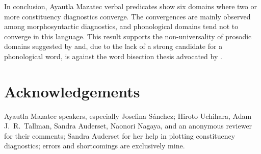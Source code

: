 \documentclass[output=paper]{langscibook}
\begin{document}
In conclusion, Ayautla Mazatec verbal predicates show six domains where two or more constituency diagnostics converge. The convergences are mainly observed among morphosyntactic diagnostics, and phonological domains tend not to converge in this language. This result supports the non-universality of prosodic domains suggested by \citet{Schiering2010} and, due to the lack of a strong candidate for a phonological word, is against the word bisection thesis advocated by \citet{dixonaikhenvald02}.


\section*{Acknowledgements}
Ayautla Mazatec speakers, especially Josefina Sánchez; Hiroto Uchihara, Adam J.~R.~Tallman, Sandra Auderset, Naonori Nagaya, and an anonymous reviewer for their comments; Sandra Auderset for her help in plotting constituency diagnostics; errors and shortcomings are exclusively mine.

\printglossary

\printbibliography[heading=subbibliography,notkeyword=this]
\end{document}

